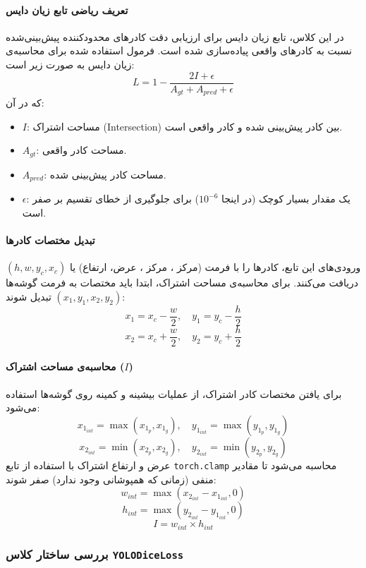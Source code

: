 \documentclass{article}
\begin{document}
\paragraph{تعریف ریاضی تابع زیان دایس}
در این کلاس، تابع زیان دایس برای ارزیابی دقت کادرهای محدودکننده پیش‌بینی‌شده نسبت به کادرهای واقعی پیاده‌سازی شده است. فرمول استفاده شده برای محاسبه‌ی زیان دایس به صورت زیر است:
$$ L = 1 - \frac{2I + \epsilon}{A_{gt} + A_{pred} + \epsilon} $$
که در آن:
\begin{itemize}
	\item $I$: مساحت اشتراک (Intersection) بین کادر پیش‌بینی شده و کادر واقعی است.
	\item $A_{gt}$: مساحت کادر واقعی.
	\item $A_{pred}$: مساحت کادر پیش‌بینی شده.
	\item $\epsilon$: یک مقدار بسیار کوچک (در اینجا $10^{-6}$) برای جلوگیری از خطای تقسیم بر صفر است.
\end{itemize}

\paragraph{تبدیل مختصات کادرها}
ورودی‌های این تابع، کادرها را با فرمت (مرکز ، مرکز ، عرض، ارتفاع) یا $(h, w, y_c, x_c)$ دریافت می‌کنند. برای محاسبه‌ی مساحت اشتراک، ابتدا باید مختصات به فرمت گوشه‌ها $(x_1, y_1, x_2, y_2)$ تبدیل شوند:
$$ x_1 = x_c - \frac{w}{2}, \quad y_1 = y_c - \frac{h}{2} $$
$$ x_2 = x_c + \frac{w}{2}, \quad y_2 = y_c + \frac{h}{2} $$

\paragraph{محاسبه‌ی مساحت اشتراک ($I$)}
برای یافتن مختصات کادر اشتراک، از عملیات بیشینه و کمینه روی گوشه‌ها استفاده می‌شود:
$$ x_{1_{int}} = \max(x_{1_p}, x_{1_g}), \quad y_{1_{int}} = \max(y_{1_p}, y_{1_g}) $$
$$ x_{2_{int}} = \min(x_{2_p}, x_{2_g}), \quad y_{2_{int}} = \min(y_{2_p}, y_{2_g}) $$
عرض و ارتفاع اشتراک با استفاده از تابع \texttt{torch.clamp} محاسبه می‌شود تا مقادیر منفی (زمانی که همپوشانی وجود ندارد) صفر شوند:
$$ w_{int} = \max(x_{2_{int}} - x_{1_{int}}, 0) $$
$$ h_{int} = \max(y_{2_{int}} - y_{1_{int}}, 0) $$
$$ I = w_{int} \times h_{int} $$

\subsubsection{بررسی ساختار کلاس \texttt{YOLODiceLoss}}
\end{document}
